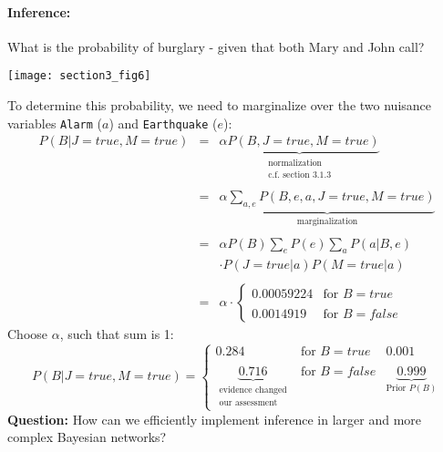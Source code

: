 \paragraph{Inference:} What is the probability of burglary - given that both Mary and John call?
\begin{center} \texttt{[image: section3\_fig6]} \end{center}
To determine this probability, we need to marginalize over the two 
nuisance variables \texttt{Alarm} ($a$) and \texttt{Earthquake} ($e$):
\begin{equation}
	\begin{array}{lll}
	P(B|J=true, M=true) 
	& = & \underbrace{ \alpha P(B, J=true, M=true) }_{
		\substack{ \text{normalization} \\ \text{c.f. section 3.1.3}}} \\\\
	& = & \underbrace{ \alpha \sum\limits_{a,e} P(B, e, a, 
				J=true, M=true) }_{
		\text{marginalization}} \\\\
	& = & \alpha P(B) \sum\limits_e P(e) \sum\limits_a P(a|B,e) \\
	&& \cdot P(J=true|a) P(M=true|a) \\\\
	& = & \alpha \cdot \left \{ \begin{array}{ll}
			0.00059224 & \text{for } B=true \\\\
			0.0014919 & \text{for } B=false
		\end{array} \right.
	\end{array}
\end{equation}
Choose $\alpha$, such that sum is 1:
\begin{equation}
	P(B|J=true, M=true) = \left \{ \begin{array}{clc}
		0.284 & \text{for } B=true & 0.001 \\\\
		\underbrace{0.716}_{\substack{\text{evidence changed} \\
					\text{our assessment}}}
			& \text{for } B=false 
			& \underbrace{0.999}_{\text{Prior } P(B)}
	\end{array} \right.
\end{equation}
\textbf{Question:} How can we efficiently implement inference in larger and more complex Bayesian networks?


